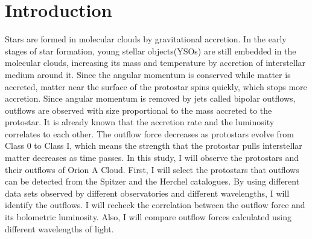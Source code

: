\documentclass[twoside,11pt]{gshs_thesis}
\begin{document}
\cleardoublepage
\clearpage
\listoffigures	%

\cleardoublepage
\clearpage
\listoftables  %


\cleardoublepage
\clearpage
\renewcommand{\thepage}{\arabic{page}}
\setcounter{page}{1}



\section{Introduction}

Stars are formed in molecular clouds by gravitational accretion. In the early stages of star formation, young stellar objects(YSOs) are still embedded in the molecular clouds, increasing its mass and temperature by accretion of interstellar medium around it. Since the angular momentum is conserved while matter is accreted, matter near the surface of the protostar spins quickly, which stops more accretion. Since angular momentum is removed by jets called bipolar outflows, outflows are observed with size proportional to the mass accreted to the protostar. \cite{Bontemps}
It is already known that the accretion rate and the luminosity correlates to each other. \cite{Kang} The outflow force decreases as protostars evolve from Class 0 to Class I, which means the strength that the protostar pulls interstellar matter decreases as time passes. 
In this study, I will observe the protostars and their outflows of Orion A Cloud. First, I will select the protostars that outflows can be detected from the Spitzer and the Herchel catalogues. \cite{Spitzer} \cite{HerschelFurlan} By using different data sets observed by different observatories and different wavelengths, I will identify the outflows. I will recheck the correlation between the outflow force and its bolometric luminosity. Also, I will compare outflow forces calculated using different wavelengths of light. 
\end{document}
